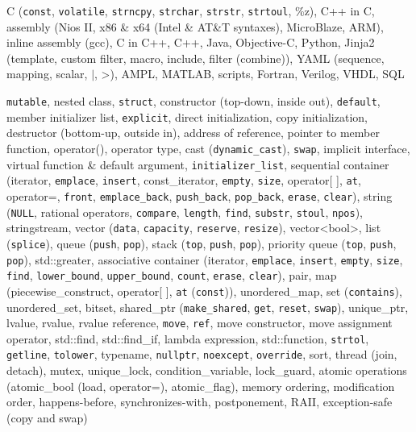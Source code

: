 \documentclass[letterpaper,11pt]{article}
\begin{document}
\begin{description}
\setlength{\itemindent}{-0.1in}

\item[Programming Languages:] C ({\tt const}, {\tt volatile}, {\tt strncpy}, {\tt strchar}, {\tt strstr}, {\tt strtoul}, \%z), C++ in C,
assembly (Nios II, x86 \& x64 (Intel \& AT\&T syntaxes), MicroBlaze, ARM),
inline assembly (gcc), C in C++,
%
C++,
%
Java, Objective-C,
%
Python,
%
Jinja2 (template, custom filter, macro, include, filter (combine)), YAML (sequence, mapping, scalar, $|$, \textgreater),
AMPL, MATLAB,
%
scripts,
%
Fortran, Verilog, VHDL, SQL %

\item[C++:] {\tt mutable}, nested class,
{\tt struct}, constructor (top-down, inside out), {\tt default}, member initializer list, {\tt explicit}, direct initialization, copy initialization,
destructor (bottom-up, outside in), address of reference, pointer to member function, operator(), operator type,
cast ({\tt dynamic\_cast}), {\tt swap},
implicit interface, virtual function \& default argument, {\tt initializer\_list},
%
sequential container (iterator, {\tt emplace}, {\tt insert}, const\_iterator,
{\tt empty}, {\tt size}, operator[ ], {\tt at}, operator=, {\tt front}, {\tt emplace\_back},
{\tt push\_back}, {\tt pop\_back}, {\tt erase}, {\tt clear}),
%
string ({\tt NULL}, rational operators, {\tt compare}, {\tt length}, {\tt find}, {\tt substr}, {\tt stoul}, {\tt npos}), stringstream,
%
vector ({\tt data}, {\tt capacity}, {\tt reserve}, {\tt resize}), vector\textless bool\textgreater,
list ({\tt splice}),
queue ({\tt push}, {\tt pop}), stack ({\tt top}, {\tt push}, {\tt pop}),
priority queue ({\tt top}, {\tt push}, {\tt pop}), std::greater,
%
associative container (iterator, {\tt emplace}, {\tt insert}, {\tt empty}, {\tt size},
{\tt find}, {\tt lower\_bound}, {\tt upper\_bound},
{\tt count}, {\tt erase}, {\tt clear}),
%
pair, map (piecewise\_construct, operator[ ], {\tt at} ({\tt const})), unordered\_map, set ({\tt contains}), unordered\_set,
%
bitset,
%
shared\_ptr ({\tt make\_shared}, {\tt get}, {\tt reset}, {\tt swap}), unique\_ptr,
lvalue, rvalue, rvalue reference, {\tt move}, {\tt ref}, move constructor, move assignment operator,
%
std::find, std::find\_if, lambda expression, std::function, {\tt strtol}, {\tt getline}, {\tt tolower},
typename, {\tt nullptr}, {\tt noexcept}, {\tt override},
sort,
%
thread (join, detach),
mutex, unique\_lock, condition\_variable, lock\_guard,
atomic operations (atomic\_bool (load, operator=), atomic\_flag), memory ordering, modification order, happens-before, synchronizes-with,
%
postponement, RAII, exception-safe (copy and swap)


\end{description}
\end{document}
